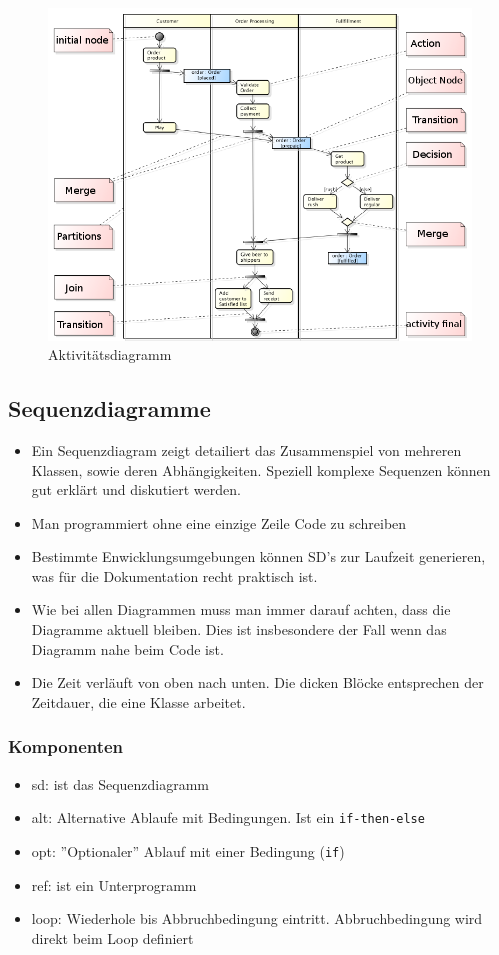 \begin{figure}[h]
\centering
\includegraphics[width=0.8\linewidth]{images/activity_diagram}
\caption{Aktivitätsdiagramm}
\label{fig:activitydiagram}
\end{figure}

\newpage

\subsection{Sequenzdiagramme}
\begin{itemize}
	\item Ein Sequenzdiagram zeigt detailiert das Zusammenspiel von mehreren Klassen, sowie deren Abhängigkeiten. Speziell komplexe Sequenzen können gut erklärt und diskutiert werden.
	\item Man programmiert ohne eine einzige Zeile Code zu schreiben
	\item Bestimmte Enwicklungsumgebungen können SD's zur Laufzeit generieren, was für die Dokumentation recht praktisch ist.
	\item Wie bei allen Diagrammen muss man immer darauf achten, dass die Diagramme aktuell bleiben. Dies ist insbesondere der Fall wenn das Diagramm nahe beim Code ist.
	\item Die Zeit verläuft von oben nach unten. Die dicken Blöcke entsprechen der Zeitdauer, die eine Klasse arbeitet.
\end{itemize}

\subsubsection{Komponenten}
\begin{itemize}
	\item sd: ist das Sequenzdiagramm
	\item alt: Alternative Ablaufe mit Bedingungen. Ist ein \lstinline|if-then-else|
	\item opt: ''Optionaler'' Ablauf mit einer Bedingung (\lstinline|if|)
	\item ref: ist ein Unterprogramm
	\item loop: Wiederhole bis Abbruchbedingung eintritt. Abbruchbedingung wird direkt beim Loop definiert
\end{itemize}

